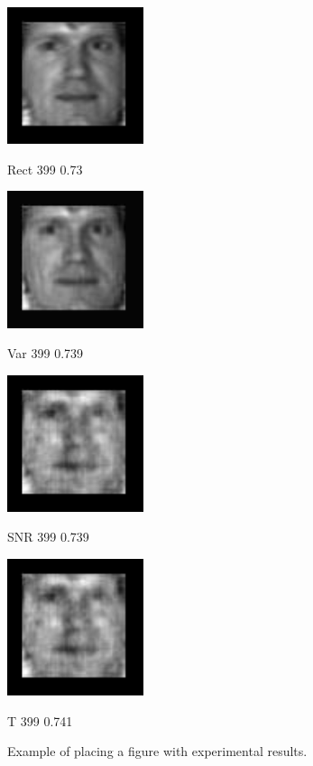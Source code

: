 \documentclass{article}
\begin{document}
\begin{figure}[htb]

\begin{minipage}[b]{.48\linewidth}
  \centering
  \centerline{\includegraphics[width=4.0cm]{recon/rectF_399_yale}}
  \centerline{Rect 399 0.73}\medskip
\end{minipage}
\hfill
\begin{minipage}[b]{0.48\linewidth}
  \centering
  \centerline{\includegraphics[width=4.0cm]{recon/varF_399_yale}}
  \centerline{Var 399 0.739}\medskip
\end{minipage}
%
\begin{minipage}[b]{.48\linewidth}
  \centering
  \centerline{\includegraphics[width=4.0cm]{recon/snrF_399_yale}}
  \centerline{SNR 399 0.739}\medskip
\end{minipage}
\hfill
\begin{minipage}[b]{0.48\linewidth}
  \centering
  \centerline{\includegraphics[width=4.0cm]{recon/tF_399_yale}}
  \centerline{T 399 0.741}\medskip
\end{minipage}
%
\caption{Example of placing a figure with experimental results.}
\label{fig:res}
%
\end{figure}
\end{document}

